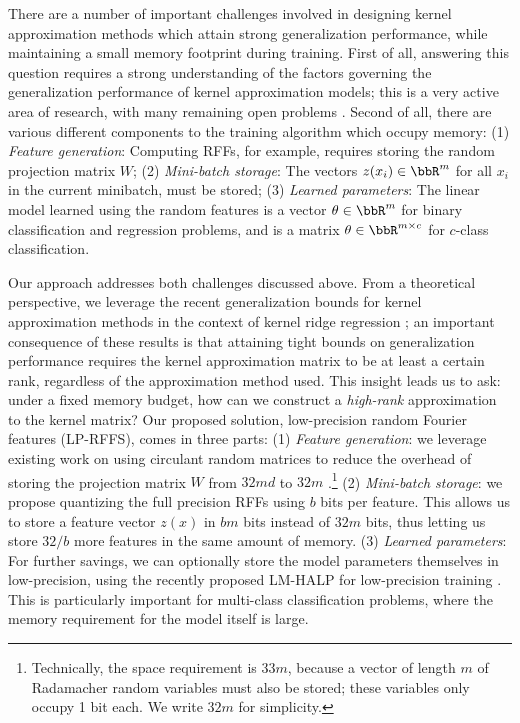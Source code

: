 There are a number of important challenges involved in designing kernel approximation methods which attain strong generalization performance, while maintaining a small memory footprint during training. First of all, answering this question requires a strong understanding of the factors governing the generalization performance of kernel approximation models; this is a very active area of research, with many remaining open problems \citep{rudi17,avron17,musco17,bach17}. Second of all, there are various different components to the training algorithm which occupy memory: (1) \textit{Feature generation}: Computing RFFs, for example, requires storing the random projection matrix $W$; (2) \textit{Mini-batch storage}: The vectors $z(x_i)\in\RR^m$ for all $x_i$ in the current minibatch, must be stored; (3) \textit{Learned parameters}: The linear model learned using the random features is a vector $\theta \in \RR^m$ for binary classification and regression problems, and is a matrix $\theta \in \RR^{m\times c}$ for $c$-class classification. %

Our approach addresses both challenges discussed above. From a theoretical perspective, we leverage the recent generalization bounds for kernel approximation methods in the context of kernel ridge regression \citep{avron17,musco17}; an important consequence of these results is that attaining tight bounds on generalization performance requires the kernel approximation matrix to be at least a certain rank, regardless of the approximation method used. This insight leads us to ask: under a fixed memory budget, how can we construct a \textit{high-rank} approximation to the kernel matrix?  Our proposed solution, low-precision random Fourier features (LP-RFFS), comes in three parts: (1)  \textit{Feature generation}: we leverage existing work on using circulant random matrices to reduce the overhead of storing the projection matrix $W$ from $32md$ to $32m$ \citep{yu15}.\footnote{Technically, the space requirement is $33m$, because a vector of length $m$ of Radamacher random variables must also be stored; these variables only occupy 1 bit each. We write $32m$ for simplicity.} (2) \textit{Mini-batch storage}: we propose quantizing the full precision RFFs using $b$ bits per feature. This allows us to store a feature vector $z(x)$ in $bm$ bits instead of $32m$ bits, thus letting us store $32/b$ more features in the same amount of memory. (3) \textit{Learned parameters}: For further savings, we can optionally store the model parameters themselves in low-precision, using the recently proposed LM-HALP for low-precision training \citep{halp18}. This is particularly important for multi-class classification problems, where the memory requirement for the model itself is large.

